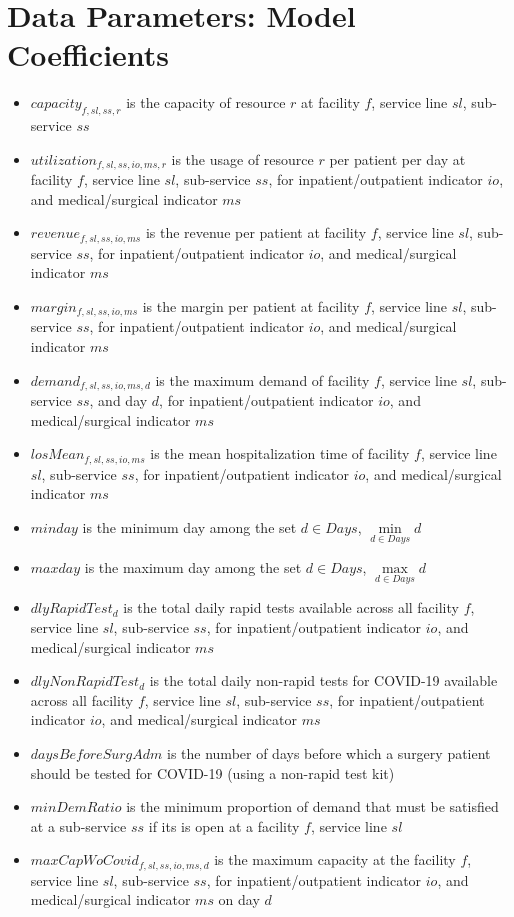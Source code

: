 \documentclass[10pt, letterpaper]{article}
\begin{document}
\section*{Data Parameters: Model Coefficients}
\begin{itemize}
\item[ ] $capacity_{f,sl,ss,r}$  is the capacity of resource $r$ at facility $f$, service line $sl$, sub-service $ss$
\item[ ] $utilization_{f,sl,ss,io,ms,r}$ is the usage of resource $r$ per patient per day at facility $f$, service line $sl$, sub-service $ss$, for inpatient/outpatient indicator $io$, and medical/surgical indicator $ms$
\item[ ] $revenue_{f,sl,ss,io,ms}$  is the revenue per patient at facility $f$, service line $sl$, sub-service $ss$, for inpatient/outpatient indicator $io$, and medical/surgical indicator $ms$
\item[ ] $margin_{f,sl,ss,io,ms}$  is the margin per patient at facility $f$, service line $sl$, sub-service $ss$, for inpatient/outpatient indicator $io$, and medical/surgical indicator $ms$
\item[ ] $demand_{f,sl,ss,io,ms,d}$ is the maximum demand of facility $f$, service line $sl$, sub-service $ss$, and day $d$, for inpatient/outpatient indicator $io$, and medical/surgical indicator $ms$
\item[ ] $losMean_{f,sl,ss,io,ms}$  is the mean hospitalization time of facility $f$, service line $sl$, sub-service $ss$, for inpatient/outpatient indicator $io$, and medical/surgical indicator $ms$
\item[ ] $minday$ is the minimum day among the set $ d \in Days$, ${\min\limits_{d \in Days} d}$
\item[ ] $maxday$ is the maximum day among the set $ d \in Days$, ${\max\limits_{d \in Days} d}$
\item[ ] $dlyRapidTest_{d}$ is the total daily rapid tests available across all facility $f$, service line $sl$, sub-service $ss$, for inpatient/outpatient indicator $io$, and medical/surgical indicator $ms$ 
\item[ ] $dlyNonRapidTest_{d}$ is the total daily non-rapid tests for COVID-19 available across all facility $f$, service line $sl$, sub-service $ss$, for inpatient/outpatient indicator $io$, and medical/surgical indicator $ms$ 

\pagebreak

\item[ ] $daysBeforeSurgAdm$ is the number of days before which a surgery patient should be tested for COVID-19 (using a non-rapid test kit) 
\item[ ] $minDemRatio$ is the minimum proportion of demand that must be satisfied at a sub-service $ss$ if its is open at a facility $f$, service line $sl$ 
\item[ ] $maxCapWoCovid_{f,sl,ss,io,ms,d}$ is the maximum capacity at the facility $f$, service line $sl$, sub-service $ss$, for inpatient/outpatient indicator $io$, and medical/surgical indicator $ms$ on day $d$ \end{itemize}
\end{document}
